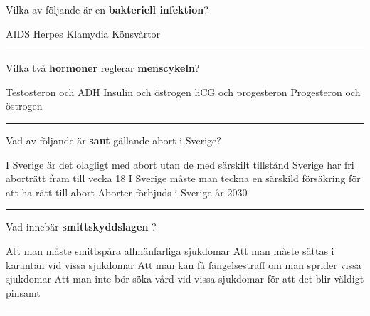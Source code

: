 \documentclass{exam}
\begin{document}
\vspace{5mm} %
\begin{center}
\end{center}
\vspace{5mm} %

\begin{questions}

\question Vilka av följande är en \textbf{bakteriell infektion}?
\begin{checkboxes}
   \choice AIDS
   \choice Herpes
   \choice Klamydia
   \choice Könsvårtor
\end{checkboxes}

\vspace{5mm} 
\hrule 
\vspace{5mm} 

\question Vilka två \textbf{hormoner} reglerar \textbf{menscykeln}?
\begin{checkboxes}
   \choice Testosteron och ADH
   \choice Insulin och östrogen
   \choice hCG och progesteron
   \choice Progesteron och östrogen
\end{checkboxes}

\vspace{5mm} 
\hrule 
\vspace{5mm} 

\question Vad av följande är \textbf{sant} gällande abort i Sverige?
\begin{checkboxes}
   \choice I Sverige är det olagligt med abort utan de med särskilt tillstånd
   \choice Sverige har fri aborträtt fram till vecka 18
   \choice I Sverige måste man teckna en särskild försäkring för att ha rätt till abort
   \choice Aborter förbjuds i Sverige år 2030
\end{checkboxes}

\vspace{5mm} 
\hrule 
\vspace{5mm} 

\question Vad innebär \textbf{smittskyddslagen} ?
\begin{checkboxes}
   \choice Att man måste smittspåra allmänfarliga sjukdomar
   \choice Att man måste sättas i karantän vid vissa sjukdomar
   \choice Att man kan få fängelsestraff om man sprider vissa sjukdomar
   \choice Att man inte bör söka vård vid vissa sjukdomar för att det blir väldigt pinsamt
\end{checkboxes}
\vspace{5mm} 
\hrule 
\vspace{5mm} 


\end{questions}
\end{document}
